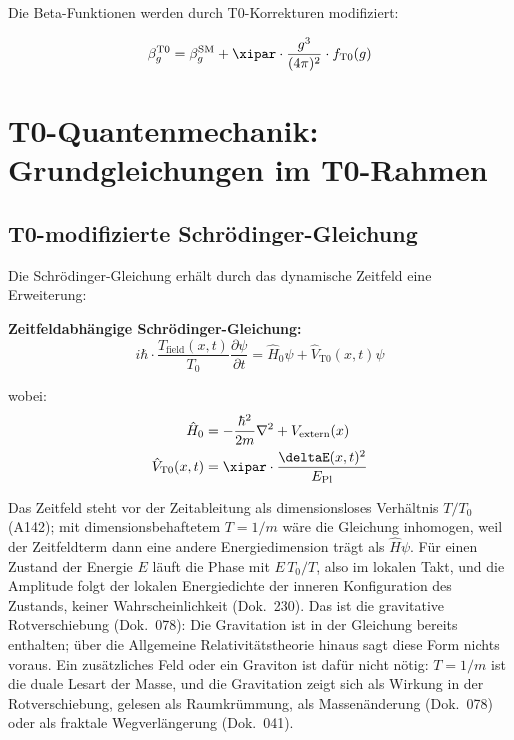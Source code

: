 	Die Beta-Funktionen werden durch T0-Korrekturen modifiziert:
	
	\begin{equation}
		\beta_g^{\text{T0}} = \beta_g^{\text{SM}} + \xipar \cdot \frac{g^3}{(4\pi)^2} \cdot f_{\text{T0}}(g)
	\end{equation}
	
	\section{T0-Quantenmechanik: Grundgleichungen im T0-Rahmen}
	
	\subsection{T0-modifizierte Schrödinger-Gleichung}
	
	Die Schrödinger-Gleichung erhält durch das dynamische Zeitfeld eine Erweiterung:
	
	\begin{tcolorbox}[colback=cyan!5!white,colframe=cyan!75!black,title=T0-Schrödinger-Gleichung]
		\textbf{Zeitfeldabhängige Schrödinger-Gleichung:}
		\begin{equation}
			i\hbar \cdot \frac{T_{\text{field}}(x,t)}{T_0} \frac{\partial\psi}{\partial t} = \hat{H}_0 \psi + \hat{V}_{\text{T0}}(x,t) \psi
		\end{equation}
		
		wobei:
		\begin{align}
			\hat{H}_0 &= -\frac{\hbar^2}{2m} \nabla^2 + V_{\text{extern}}(x) \\
			\hat{V}_{\text{T0}}(x,t) &= \xipar \cdot \frac{\deltaE(x,t)^2}{E_{\text{Pl}}}
		\end{align}
	\end{tcolorbox}
	Das Zeitfeld steht vor der Zeitableitung als dimensionsloses Verhältnis $T/T_0$ (A142); mit dimensionsbehaftetem $T=1/m$ wäre die Gleichung inhomogen, weil der Zeitfeldterm dann eine andere Energiedimension trägt als $\hat H\psi$. Für einen Zustand der Energie $E$ läuft die Phase mit $E\,T_0/T$, also im lokalen Takt, und die Amplitude folgt der lokalen Energiedichte der inneren Konfiguration des Zustands, keiner Wahrscheinlichkeit (Dok.~230). Das ist die gravitative Rotverschiebung (Dok.~078): Die Gravitation ist in der Gleichung bereits enthalten; über die Allgemeine Relativitätstheorie hinaus sagt diese Form nichts voraus. Ein zusätzliches Feld oder ein Graviton ist dafür nicht nötig: $T=1/m$ ist die duale Lesart der Masse, und die Gravitation zeigt sich als Wirkung in der Rotverschiebung, gelesen als Raumkrümmung, als Massenänderung (Dok.~078) oder als fraktale Wegverlängerung (Dok.~041).

